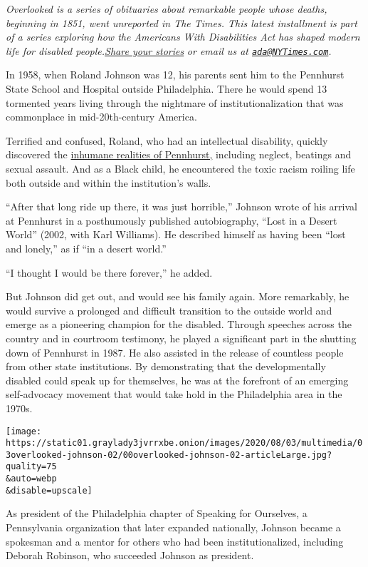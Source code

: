 \emph{Overlooked is a series of obituaries about remarkable people whose
deaths, beginning in 1851, went unreported in The Times. This latest
installment is part of a series exploring how the Americans With
Disabilities Act has shaped modern life for disabled
people.}\href{https://www.nytimes3xbfgragh.onion/2020/07/10/reader-center/disability-america-questions.html}{\emph{Share
your stories}} \emph{or email us at
\href{mailto:ada@NYTimes.com}{\nolinkurl{ada@NYTimes.com}}.}

In 1958, when Roland Johnson was 12, his parents sent him to the
Pennhurst State School and Hospital outside Philadelphia. There he would
spend 13 tormented years living through the nightmare of
institutionalization that was commonplace in mid-20th-century America.

Terrified and confused, Roland, who had an intellectual disability,
quickly discovered the
\href{https://timesmachine.nytimes3xbfgragh.onion/timesmachine/1983/11/04/017104.html?pageNumber=38}{inhumane
realities of Pennhurst,} including neglect, beatings and sexual assault.
And as a Black child, he encountered the toxic racism roiling life both
outside and within the institution's walls.

``After that long ride up there, it was just horrible,'' Johnson wrote
of his arrival at Pennhurst in a posthumously published autobiography,
``Lost in a Desert World'' (2002, with Karl Williams). He described
himself as having been ``lost and lonely,'' as if ``in a desert world.''

``I thought I would be there forever,'' he added.

But Johnson did get out, and would see his family again. More
remarkably, he would survive a prolonged and difficult transition to the
outside world and emerge as a pioneering champion for the disabled.
Through speeches across the country and in courtroom testimony, he
played a significant part in the shutting down of Pennhurst in 1987. He
also assisted in the release of countless people from other state
institutions. By demonstrating that the developmentally disabled could
speak up for themselves, he was at the forefront of an emerging
self-advocacy movement that would take hold in the Philadelphia area in
the 1970s.

\texttt{[image: https://static01.graylady3jvrrxbe.onion/images/2020/08/03/multimedia/03overlooked-johnson-02/00overlooked-johnson-02-articleLarge.jpg?quality=75\\\&auto=webp\\\&disable=upscale]}

As president of the Philadelphia chapter of Speaking for Ourselves, a
Pennsylvania organization that later expanded nationally, Johnson became
a spokesman and a mentor for others who had been institutionalized,
including Deborah Robinson, who succeeded Johnson as president.

